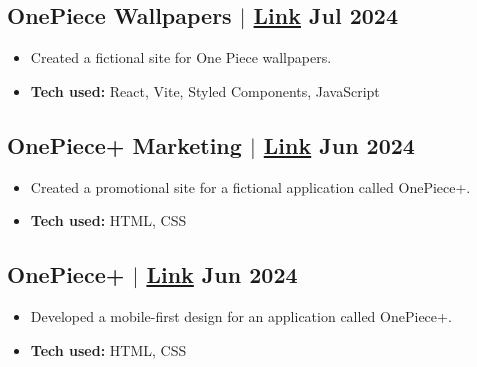 \documentclass[11pt]{article}
\begin{document}
\subsection{ OnePiece Wallpapers {\normalfont $|$ \href{ https://onepiecewallpapers.vercel.app/ }{Link}} \hfill Jul 2024 }
\vspace{10pt} %
\begin{itemize}
    \item Created a fictional site for One Piece wallpapers.
    \item \textbf{Tech used:} React, Vite, Styled Components, JavaScript
\end{itemize}

\subsection{ OnePiece+ Marketing {\normalfont $|$ \href{ https://onepieceplus.vercel.app/ }{Link}} \hfill Jun 2024 }
\vspace{10pt} %
\begin{itemize}
    \item Created a promotional site for a fictional application called OnePiece+.
    \item \textbf{Tech used:} HTML, CSS
\end{itemize}

\subsection{ OnePiece+ {\normalfont $|$ \href{ https://onepieceplus-design-1.vercel.app/ }{Link}} \hfill Jun 2024 }
\vspace{10pt} %
\begin{itemize}
    \item Developed a mobile-first design for an application called OnePiece+.
    \item \textbf{Tech used:} HTML, CSS
\end{itemize}
\end{document}
